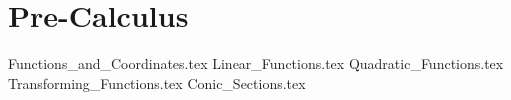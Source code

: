 \section{Pre-Calculus}

{Functions_and_Coordinates.tex}
{Linear_Functions.tex}
{Quadratic_Functions.tex}
{Transforming_Functions.tex}
{Conic_Sections.tex}